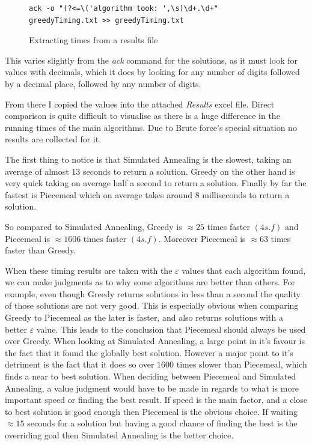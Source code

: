 \documentclass[12pt]{report}
\begin{document}
\begin{figure}[H]
\caption{Extracting times from a results file}
\label{timingAck}
\begin{verbatim}
ack -o "(?<=\('algorithm took: ',\s)\d+.\d+" greedyTiming.txt >> greedyTiming.txt
\end{verbatim}
\end{figure}

This varies slightly from the \textit{ack} command for the solutions, as it must look for values with decimals, which it does by looking for any number of digits followed by a decimal place, followed by any number of digits.

From there I copied the values into the attached \textit{Results} excel file. Direct comparison is quite difficult to visualise as there is a huge difference in the running times of the main algorithms. Due to Brute force's special situation no results are collected for it.

The first thing to notice is that Simulated Annealing is the slowest, taking an average of almost $13$ seconds to return a solution. Greedy on the other hand is very quick taking on average half a second to return a solution. Finally by far the fastest is Piecemeal which on average takes around $8$ milliseconds to return a solution.

So compared to Simulated Annealing, Greedy is $\approx 25$ times faster $(4 s.f)$ and Piecemeal is $\approx 1606$ times faster $(4 s.f)$. Moreover Piecemeal is $\approx 63$ times faster than Greedy.

When these timing results are taken with the $\varepsilon$ values that each algorithm found, we can make judgments as to why some algorithms are better than others. For example, even though Greedy returns solutions in less than a second the quality of those solutions are not very good. This is especially obvious when comparing Greedy to Piecemeal as the later is faster, and also returns solutions with a better $\varepsilon$ value. This leads to the conclusion that Piecemeal should always be used over Greedy. When looking at Simulated Annealing, a large point in it's favour is the fact that it found the globally best solution. However a major point to it's detriment is the fact that it does so over $1600$ times slower than Piecemeal, which finds a near to best solution. When deciding between Piecemeal and Simulated Annealing, a value judgment would have to be made in regards to what is more important speed or finding the best result. If speed is the main factor, and a close to best solution is good enough then Piecemeal is the obvious choice. If waiting $\approx 15$ seconds for a solution but having a good chance of finding the best is the overriding goal then Simulated Annealing is the better choice.
\end{document}
